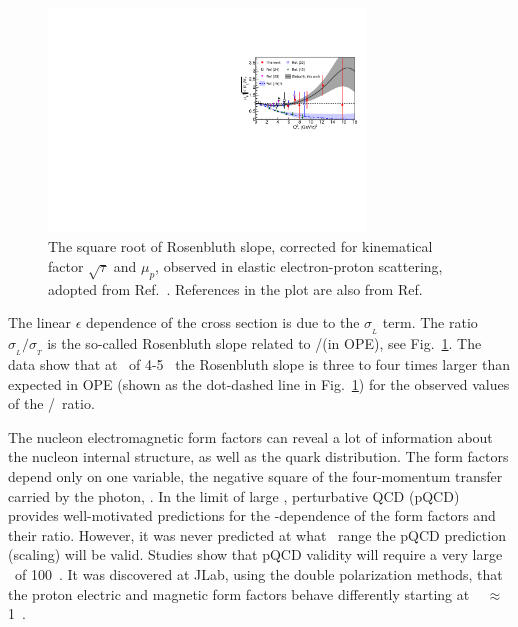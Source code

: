 \begin{figure}[h]
\includegraphics[trim = 0mm 0mm 0mm 40mm, width = 0.75\textwidth]{Plots/Fig1.pdf}
\caption{The square root of Rosenbluth slope, corrected for kinematical factor $\sqrt {\tau}$ and $\mu_p$, observed in elastic electron-proton scattering,
adopted from Ref.~\cite{Christy2020ab}. References in the plot are also from Ref.~\cite{Christy2020ab}}
\label{pic:Fig1}
\end{figure}

The linear $\epsilon$ dependence of the cross section is due to the $\sigma_{_L}$ term. %
The ratio $\sigma_{_L}/\sigma_{_T}$ is the so-called Rosenbluth slope related to \gef/\gmf (in OPE), see Fig.~\ref{pic:Fig1}.
The data show that at \qsq~of 4-5 \gevcsq~the Rosenbluth slope is three to four times larger than expected in OPE (shown as the dot-dashed line in Fig.~\ref{pic:Fig1}) for the observed values of the \gep/\gmp~ratio.

%
The nucleon electromagnetic form factors can reveal a lot of information about the nucleon internal structure, as well as the quark distribution. 
The form factors depend only on one variable, the negative square of the four-momentum transfer carried by the photon, \qsq. 
In the limit of large \qsq, perturbative QCD (pQCD) provides well-motivated predictions for the \qsq-dependence of the form factors and their ratio. 
However, it was never predicted at what \qsq~range the pQCD prediction (scaling) will be valid.
Studies show that pQCD validity will require a very large \qsq~of 100~\gevcsq.
It was discovered at JLab, using the double polarization methods, that the proton electric and magnetic form factors behave differently starting at \qsq~ $\approx$ 1~\gevcsq.
 
